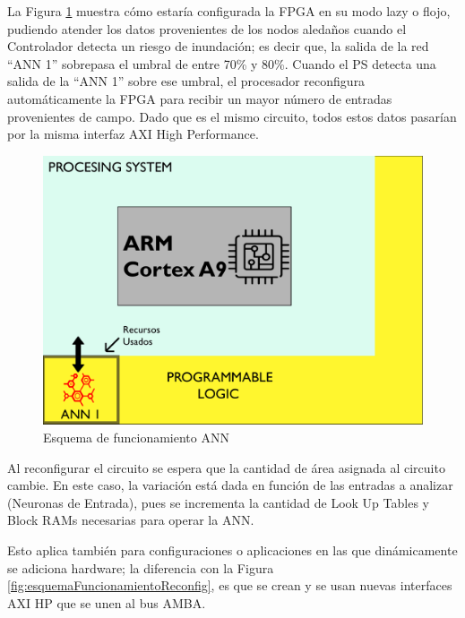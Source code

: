 La Figura \ref{fig:esquemaFuncionamiento} muestra cómo estaría configurada la FPGA en su modo lazy o flojo, pudiendo atender los datos provenientes de los nodos aledaños cuando el Controlador detecta un riesgo de inundación; es decir que, la salida de la red ``ANN 1'' sobrepasa el umbral de entre 70\% y 80\%. Cuando el PS detecta una salida de la ``ANN 1'' sobre ese umbral, el procesador reconfigura automáticamente la FPGA para recibir un mayor número de entradas provenientes de campo. Dado que es el mismo circuito, todos estos datos pasarían por la misma interfaz AXI High Performance.

\begin{figure}[!ht]
	\centering
		\includegraphics[scale=0.5]{Figures/ANN1}
	\caption{Esquema de funcionamiento ANN}
	\label{fig:esquemaFuncionamiento}
\end{figure}

Al reconfigurar el circuito se espera que la cantidad de área asignada al circuito cambie. En este caso, la variación está dada en función de las entradas a analizar (Neuronas de Entrada), pues se incrementa la cantidad de Look Up Tables y Block RAMs necesarias para operar la ANN.

Esto aplica también para configuraciones o aplicaciones en las que dinámicamente se adiciona hardware; la diferencia con la Figura \ref{fig:esquemaFuncionamientoReconfig}, es que se crean y se usan nuevas interfaces AXI HP que se unen al bus AMBA.

